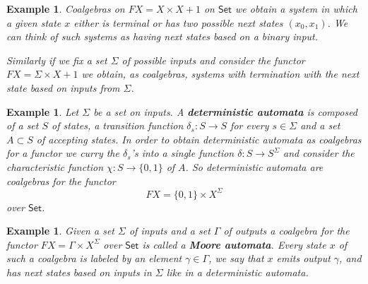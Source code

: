 \documentclass[letterpaper, 11pt, oneside]{memoir}
\theoremstyle{myteo}
\newtheorem{example}[theorem]{Example}
\numberwithin{equation}{section}
\newcommand{\marginnote}[1]{\marginpar{\footnotesize #1}}
\newcommand{\Set}{\textsf{Set}}
\begin{document}
\begin{example}
  Coalgebras on \(FX = X \times X + 1\) on \(\Set\) we obtain a system in which a given state \(x\) either is terminal or has two possible next states \((x_0, x_1)\).
  We can think of such systems as having next states based on a binary input.

  Similarly if we fix a set \(\Sigma\) of possible inputs and consider the functor \(FX = \Sigma \times X + 1\) we obtain, as coalgebras, systems with termination with the next state based on inputs from \(\Sigma\).
\end{example}

\begin{example}
  \label{ex:deterministic-automata}
  Let \(\Sigma\) be a set on inputs.
  A \textbf{deterministic automata}\marginnote{deterministic automata} is composed of a set \(S\) of states, a transition function \(\delta_s : S \to S\) for every \(s \in \Sigma\) and a set \(A \subset S\) of accepting states.
  In order to obtain deterministic automata as coalgebras for a functor we curry the \(\delta_s\)'s into a single function \(\delta:S \to S^\Sigma\) and consider the characteristic function \(\chi : S \to \{0, 1\}\) of \(A\).
  So deterministic automata are coalgebras for the functor
  \begin{equation*}
    FX = \{0, 1\} \times X^\Sigma
  \end{equation*}
  over \(\Set\).
\end{example}

\begin{example}
  Given a set \(\Sigma\) of inputs and a set \(\Gamma\) of outputs a coalgebra for the functor \(FX = \Gamma \times X^\Sigma\) over \(\Set\) is called a \textbf{Moore automata}.
  Every state \(x\) of such a coalgebra is labeled by an element \(\gamma \in \Gamma\), we say that \(x\) emits output \(\gamma\), and has next states based on inputs in \(\Sigma\) like in a deterministic automata.
\end{example}
\end{document}
